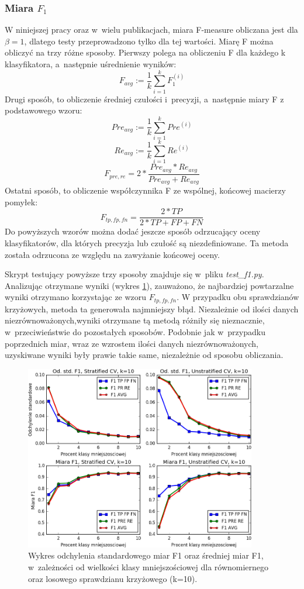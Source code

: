\subsubsection{Miara $F_1$}
W niniejszej pracy oraz w~wielu publikacjach, miara F-measure obliczana jest dla $\beta=1$, dlatego testy przeprowadzono tylko dla tej wartości. Miarę F można obliczyć na trzy różne sposoby. Pierwszy polega na obliczeniu F dla każdego k klasyfikatora, a~następnie uśrednienie wyników:
\[F_{avg} := \frac{1}{k} \sum_{i=1}^{k} F_1^{(i)}\]
Drugi sposób, to obliczenie średniej czułości i~precyzji, a~następnie miary F z podstawowego wzoru:
\[Pre_{avg} := \frac{1}{k} \sum_{i=1}^{k} Pre^{(i)}\]
\[Re_{avg} := \frac{1}{k} \sum_{i=1}^{k} Re^{(i)}\]
\[F_{pre, re} = 2 * \frac{Pre_{avg}*Re_{avg}}{Pre_{avg}+Re_{avg}} \]
Ostatni sposób, to obliczenie współczynnika F ze wspólnej, końcowej macierzy pomyłek:
\[F_{tp, fp, fn} = \frac{2*TP}{2*TP+FP+FN} \]
Do powyższych wzorów można dodać jeszcze sposób odrzucający oceny klasyfikatorów, dla których precyzja lub czułość są niezdefiniowane. Ta metoda została odrzucona ze względu na zawyżanie końcowej oceny. \par 
Skrypt testujący powyższe trzy sposoby znajduje się w~pliku \textit{test\_f1.py}. Analizując otrzymane wyniki (wykres \ref{fig:wykresf1}), zauważono, że najbardziej powtarzalne wyniki otrzymano korzystając ze wzoru $F_{tp, fp, fn}$. W przypadku obu sprawdzianów krzyżowych, metoda ta generowała najmniejszy błąd. Niezależnie od ilości danych niezrównoważonych,wyniki otrzymane tą metodą różniły się nieznacznie, w~przeciwieństwie do pozostałych sposobów. Podobnie jak w~przypadku poprzednich miar, wraz ze wzrostem ilości danych niezrównoważonych, uzyskiwane wyniki były prawie takie same, niezależnie od sposobu obliczania.
\begin{figure}[H]
	\centering
	\includegraphics[width=0.9\textwidth]{./images/miara-F1.png}
	\caption[Odchylenie standardowe oraz średnia miar F1 dla sprawdzianu krzyżowego]{Wykres odchylenia standardowego miar F1 oraz średniej miar F1, w~zależności od wielkości klasy mniejszościowej dla równomiernego oraz losowego sprawdzianu krzyżowego (k=10).}
	\label{fig:wykresf1}
\end{figure}
